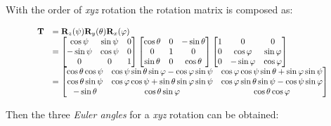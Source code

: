     With the order of \textit{xyz} rotation the rotation matrix is
    composed as:

    \begin{equation}
        \scalebox{0.85}{
            $ \begin{array}{ll}
                \mathbf{T}
                &= \mathbf{R}_{z}(\psi)\mathbf{R}_{y}(\theta)\mathbf{R}_{x}(\varphi) \\
                &=
                \begin{bmatrix}
                    \cos \psi & \sin \psi & 0 \\
                    -\sin \psi & \cos \psi & 0 \\
                    0 & 0 & 1
                \end{bmatrix}
                \begin{bmatrix}
                    \cos \theta & 0 & -\sin \theta \\
                    0 & 1 & 0 \\
                    \sin \theta & 0 & \cos \theta
                \end{bmatrix}
                \begin{bmatrix}
                    1 & 0 & 0 \\
                    0 & \cos \varphi & \sin \varphi \\
                    0 & -\sin \varphi & \cos \varphi
                \end{bmatrix} \\
                &=
                \begin{bmatrix}
                    \cos \theta \cos \psi
                    & \cos \psi \sin \theta \sin \varphi - \cos \varphi \sin \psi
                    & \cos \varphi \cos \psi \sin \theta + \sin \varphi \sin \psi \\
                    \cos \theta \sin \psi
                    & \cos \varphi \cos \psi + \sin \theta \sin \varphi \sin \psi
                    & \cos \varphi \sin \theta \sin \psi - \cos \psi \sin \varphi \\
                    -\sin \theta
                    & \cos \theta \sin \varphi
                    & \cos \theta \cos \varphi
                \end{bmatrix}
            \end{array} $
        }
    \end{equation}

    Then the three \textit{Euler angles} for a \textit{xyz} rotation
    can be obtained:

